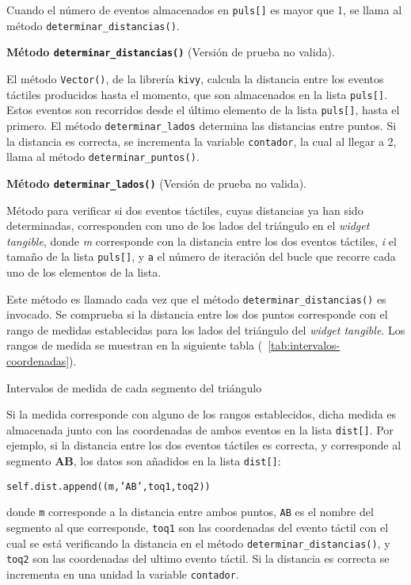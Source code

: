 Cuando el número de eventos almacenados en \texttt{puls[]} 
es mayor que 1, se llama al método \texttt{determinar\_distancias()}.

\textbf{Método \texttt{determinar\_distancias()}} (Versión de prueba no valida).

El método \texttt{Vector()}, de la librería \texttt{kivy}, calcula la distancia entre los eventos táctiles producidos hasta el momento, que son almacenados en la lista \texttt{puls[]}. Estos eventos son recorridos desde el último elemento de la lista \texttt{puls[]}, hasta el primero. El método \texttt{determinar\_lados} determina las distancias entre puntos. Si la distancia es correcta, se incrementa la variable \texttt{contador}, la cual al llegar a 2, llama al método \texttt{determinar\_puntos()}.

\textbf{Método \texttt{determinar\_lados()}} (Versión de prueba no valida).

Método para verificar si dos eventos táctiles, cuyas distancias ya han sido determinadas, corresponden con uno de los lados del triángulo en el \emph{widget tangible}, donde \textit{m} corresponde con la distancia entre los dos eventos táctiles, \textit{i} el tamaño de la lista \texttt{puls[]}, y \texttt{a} el número de iteración del bucle que recorre cada uno de los elementos de la lista.

Este método es llamado cada vez que el método \texttt{determinar\_distancias()} es invocado.
Se comprueba si la distancia entre los dos puntos corresponde con el rango de medidas establecidas para los lados del triángulo del \emph{widget tangible}. Los rangos de medida se muestran en la siguiente tabla (~\ref{tab:intervalos-coordenadas}).

\begin{table}[hp]
\centering
{\small

}
\caption[Intervalos de medida de cada segmento del triángulo]
{Intervalos de medida de cada segmento del triángulo}
\label{tab:intervalos-coordenadas}
\end{table}
Si la medida corresponde con alguno de los rangos establecidos, dicha medida es almacenada junto con las coordenadas de ambos eventos en la lista \texttt{dist[]}. Por ejemplo, si la distancia entre los dos eventos táctiles es correcta, y corresponde al segmento \textbf{AB}, los datos son añadidos en la lista \texttt{dist[]}:

\texttt{self.dist.append((m,'AB',toq1,toq2)) }

donde \texttt{m} corresponde a la distancia entre ambos puntos, \texttt{AB} es el nombre del segmento al que corresponde, \texttt{toq1} son las coordenadas del evento táctil con el cual se está verificando la distancia en el método \texttt{determinar\_distancias()}, y \texttt{toq2} son las coordenadas del ultimo evento táctil.
Si la distancia es correcta se incrementa en una unidad la variable \texttt{contador}.

